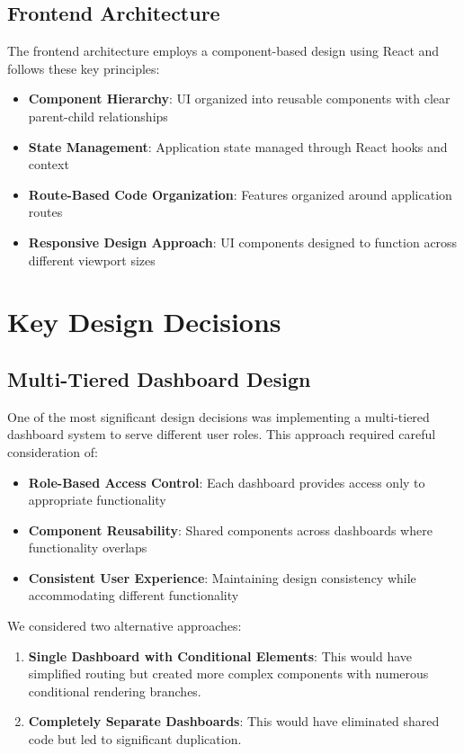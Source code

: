 \subsection{Frontend Architecture}

The frontend architecture employs a component-based design using React and follows these key principles:

\begin{itemize}
    \item \textbf{Component Hierarchy}: UI organized into reusable components with clear parent-child relationships
    \item \textbf{State Management}: Application state managed through React hooks and context
    \item \textbf{Route-Based Code Organization}: Features organized around application routes
    \item \textbf{Responsive Design Approach}: UI components designed to function across different viewport sizes
\end{itemize}

\section{Key Design Decisions}

\subsection{Multi-Tiered Dashboard Design}

One of the most significant design decisions was implementing a multi-tiered dashboard system to serve different user roles. This approach required careful consideration of:

\begin{itemize}
    \item \textbf{Role-Based Access Control}: Each dashboard provides access only to appropriate functionality
    \item \textbf{Component Reusability}: Shared components across dashboards where functionality overlaps
    \item \textbf{Consistent User Experience}: Maintaining design consistency while accommodating different functionality
\end{itemize}

We considered two alternative approaches:

\begin{enumerate}
    \item \textbf{Single Dashboard with Conditional Elements}: This would have simplified routing but created more complex components with numerous conditional rendering branches.
    \item \textbf{Completely Separate Dashboards}: This would have eliminated shared code but led to significant duplication.
\end{enumerate}

